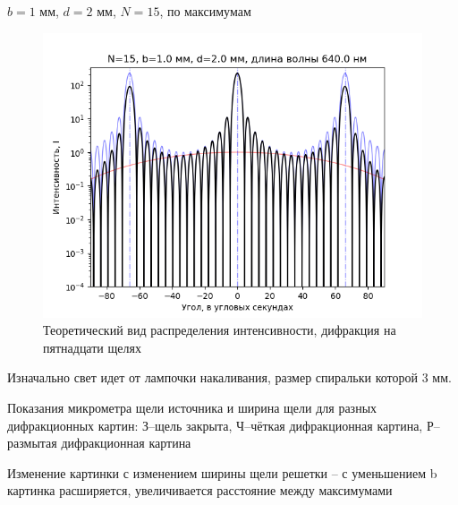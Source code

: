 \begin{table}[H]
	    \caption{$b=1$ мм, $d=2$ мм, $N=15$, по максимумам}
	    \label{tab:chem1}

	\mytable
	
\end{table}
\begin{figure}[H]
	\centering
	\includegraphics[]{plot/N15.png}
	\caption{Теоретический вид распределения интенсивности, дифракция на пятнадцати щелях}
	\label{fig:figure1}
\end{figure}

Изначально свет идет от лампочки накаливания, размер спиральки которой 3 мм.




\begin{table}[H]
	    \caption{Показания микрометра щели источника и ширина щели для разных дифракционных картин: З--щель закрыта, Ч--чёткая дифракционная картина, Р--размытая дифракционная картина}
	    \label{tab:chem1}

	\mytable
	
\end{table}



Изменение картинки с изменением ширины щели решетки -- с уменьшением b картинка расширяется, увеличивается расстояние между максимумами

